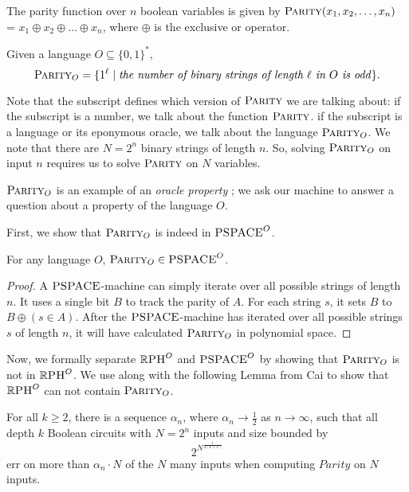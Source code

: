 \documentclass{article}
\begin{document}
\begin{definition}[$\Parityn$]
    The parity function over $n$ boolean variables is given by \emph{$\textsc{Parity}(x_1, x_2, \dots, x_n)$} = $x_1 \oplus x_2 \oplus \dots \oplus x_n$, where $\oplus$ is the exclusive or operator.
\end{definition}

\begin{definition}
Given a language $O \subseteq \{0,1\}^*$, 
\begin{equation*}
    \textsc{Parity}_O = \{ 1^\ell \mid \text{\emph{the number of binary strings of length $\ell$ in $O$ is odd}}\}.
\end{equation*}
\end{definition}

Note that the subscript defines which version of $\textsc{Parity}$ we are talking about:
if the subscript is a number, we talk about the function $\Parityn$.
if the subscript is a language or its eponymous oracle, we talk about the language $\textsc{Parity}_O$.
We note that there are $N=2^n$ binary strings of length $n$.
So, solving $\textsc{Parity}_O$ on input $n$ requires us to solve $\Parityn$ on $N$ variables.

$\textsc{Parity}_O$ is an example of an \textit{oracle property} \cite{Ang980};
we ask our machine to answer a question about a property of the language $O$.

First, we show that $\textsc{Parity}_O$ is indeed in $\textsc{PSPACE}^O$.

\begin{lemma}
    For any language $O$, $\textsc{Parity}_O \in \textsc{PSPACE}^O$.
\end{lemma}
\begin{proof}
    A $\textsc{PSPACE}$-machine can simply iterate over all possible strings of length $n$.
    It uses a single bit $B$ to track the parity of $A$.
    For each string $s$, it sets $B$ to $B \oplus (s \in A)$.
    After the $\textsc{PSPACE}$-machine has iterated over all possible strings $s$ of length $n$, it will have calculated $\textsc{Parity}_O$ in polynomial space.
\end{proof}
Now, we formally separate $\mathbb{R}\textsc{PH}^O$ and $\textsc{PSPACE}^O$ by showing that $\textsc{Parity}_O$ is not in $\mathbb{R}\textsc{PH}^O$.
We use 
along with the following Lemma from Cai to show that $\mathbb{R}\textsc{PH}^O$ can not contain $\textsc{Parity}_O$.

\begin{lemma}
    For all $k\geq 2$, there is a sequence $\alpha_n$, where $\alpha_n \rightarrow \frac{1}{2}$ as $n\rightarrow \infty$, such that all depth $k$ Boolean circuits with $N=2^n$ inputs and size bounded by $$2^{N^{\frac{1}{4(k+1)}}}$$ err on more than $\alpha_n\cdot N$ of the $N$ many inputs when computing $Parity$ on $N$ inputs.
\end{lemma}
\end{document}

